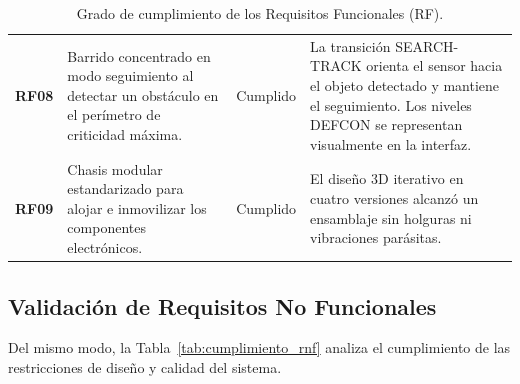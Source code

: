 \begin{table}[H]
{\begin{tabular}{p{1.5cm} p{5.5cm} p{2.2cm} p{6.5cm}}
        \addlinespace
        \textbf{RF08} & Barrido concentrado en modo seguimiento al detectar un obstáculo en el perímetro de criticidad máxima. & Cumplido & La transición SEARCH-TRACK orienta el sensor hacia el objeto detectado y mantiene el seguimiento. Los niveles DEFCON se representan visualmente en la interfaz. \\
        \addlinespace
        \textbf{RF09} & Chasis modular estandarizado para alojar e inmovilizar los componentes electrónicos. & Cumplido & El diseño 3D iterativo en cuatro versiones alcanzó un ensamblaje sin holguras ni vibraciones parásitas. \\
        \bottomrule
    \end{tabular}
}
\caption{Grado de cumplimiento de los Requisitos Funcionales (RF).}
\label{tab:cumplimiento_rf}
\end{table}

\subsection{Validación de Requisitos No Funcionales}

Del mismo modo, la Tabla~\ref{tab:cumplimiento_rnf} analiza el cumplimiento de las restricciones de diseño y calidad del sistema.

